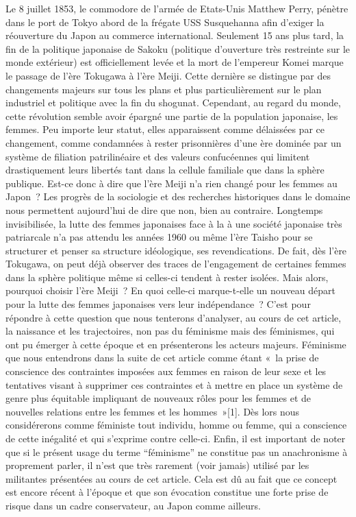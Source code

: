 \documentclass[11pt,a4paper]{article}
\begin{document}
Le 8 juillet 1853, le commodore de l’armée de Etats-Unis Matthew Perry, pénètre dans le port de Tokyo abord de la frégate USS Susquehanna afin d’exiger la réouverture du Japon au commerce international. Seulement 15 ans plus tard, la fin de la politique japonaise de Sakoku (politique d’ouverture très restreinte sur le monde extérieur) est officiellement levée et la mort de l’empereur Komei marque le passage de l’ère Tokugawa à l’ère Meiji. Cette dernière se distingue par des changements majeurs sur tous les plans et plus particulièrement sur le plan industriel et politique avec la fin du shogunat. Cependant, au regard du monde, cette révolution semble avoir épargné une partie de la population japonaise, les femmes. Peu importe leur statut, elles apparaissent comme délaissées par ce changement, comme condamnées à rester prisonnières d’une ère dominée par un système de filiation patrilinéaire et des valeurs confucéennes qui limitent drastiquement leurs libertés tant dans la cellule familiale que dans la sphère publique. Est-ce donc à dire que l’ère Meiji n’a rien changé pour les femmes au Japon~? Les progrès de la sociologie et des recherches historiques dans le domaine nous permettent aujourd’hui de dire que non, bien au contraire. Longtemps invisibilisée, la lutte des femmes japonaises face à la à une société japonaise très patriarcale n’a pas attendu les années 1960 ou même l’ère Taisho pour se structurer et penser sa structure idéologique, ses revendications. De fait, dès l’ère Tokugawa, on peut déjà observer des traces de l’engagement de certaines femmes dans la sphère politique même si celles-ci tendent à rester isolées. Mais alors, pourquoi choisir l’ère Meiji~? En quoi celle-ci marque-t-elle un nouveau départ pour la lutte des femmes japonaises vers leur indépendance~? C’est pour répondre à cette question que nous tenterons d’analyser, au cours de cet article, la naissance et les trajectoires, non pas du féminisme mais des féminismes, qui ont pu émerger à cette époque et en présenterons les acteurs majeurs. Féminisme que nous entendrons dans la suite de cet article comme étant «~la prise de conscience des contraintes imposées aux femmes en raison de leur sexe et les tentatives visant à supprimer ces contraintes et à mettre en place un système de genre plus équitable impliquant de nouveaux rôles pour les femmes et de nouvelles relations entre les femmes et les hommes~»{[}1{]}. Dès lors nous considérerons comme féministe tout individu, homme ou femme, qui a conscience de cette inégalité et qui s’exprime contre celle-ci. Enfin, il est important de noter que si le présent usage du terme “féminisme” ne constitue pas un anachronisme à proprement parler, il n’est que très rarement (voir jamais) utilisé par les militantes présentées au cours de cet article. Cela est dû au fait que ce concept est encore récent à l’époque et que son évocation constitue une forte prise de risque dans un cadre conservateur, au Japon comme ailleurs.
\end{document}
